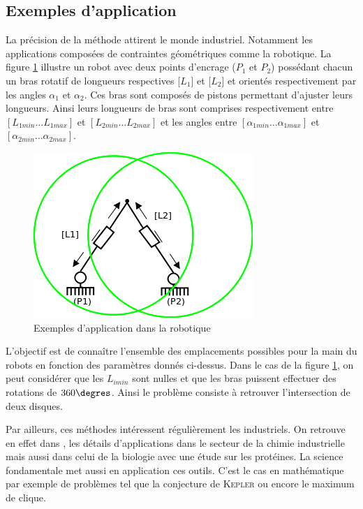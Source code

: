 \subsection{Exemples d'application}

La précision de la méthode attirent le monde industriel. Notamment les applications composées de contraintes géométriques comme la robotique. La figure \ref{fig:rob} illustre un robot avec deux points d'encrage ($P_1$ et $P_2$) possédant chacun un bras rotatif de longueurs respectives [$L_1$] et [$L_2$] et orientés respectivement par les angles $\alpha_1$ et $\alpha_2$. Ces bras sont composés de pistons permettant d'ajuster leurs longueurs. Ainsi leurs longueurs de bras sont comprises respectivement entre $[L_{1min} \dots L_{1max}]$ et $[L_{2min} \dots L_{2max}]$ et les angles entre $[\alpha_{1min} \dots \alpha_{1max}]$ et $[\alpha_{2min} \dots \alpha_{2max}]$.  

\begin{figure}[h] %
  \center
\includegraphics[scale=0.80]{img/robot2}
  \caption{Exemples d'application dans la robotique} %
 \label{fig:rob} %
\end{figure} %
L'objectif est de connaître l'ensemble des emplacements possibles pour la main du robots en fonction des paramètres donnés ci-dessus. Dans le cas de la figure \ref{fig:rob}, on peut considérer que les $L_{imin}$ sont nulles et que les bras puissent effectuer des rotations de $360 \degres$. Ainsi le problème consiste à retrouver l'intersection de deux disques. 

  Par ailleurs, ces méthodes intéressent régulièrement les industriels. On retrouve en effet dans \cite{Schichl}, les détails d'applications dans le secteur de la chimie industrielle mais aussi dans celui de la biologie avec une étude sur les protéines. La science fondamentale met aussi en application ces outils. C'est le cas en mathématique par exemple de problèmes tel que la conjecture de \textsc{Kepler} ou encore le  maximum de clique.

\clearpage
